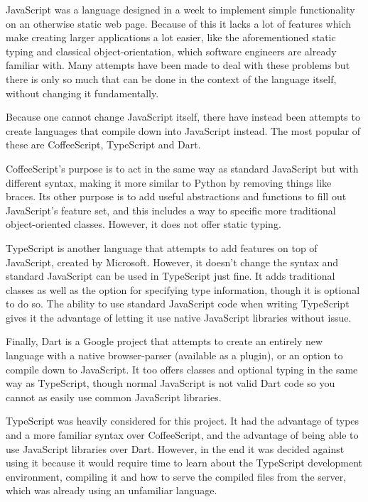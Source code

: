 JavaScript was a language designed in a week to implement simple functionality on an otherwise static web page. Because of this it lacks a lot of features which make creating larger applications a lot easier, like the aforementioned static typing and classical object-orientation, which software engineers are already familiar with. Many attempts have been made to deal with these problems but there is only so much that can be done in the context of the language itself, without changing it fundamentally.

Because one cannot change JavaScript itself, there have instead been attempts to create languages that compile down into JavaScript instead. The most popular of these are CoffeeScript, TypeScript and Dart.

CoffeeScript's purpose is to act in the same way as standard JavaScript but with different syntax, making it more similar to Python by removing things like braces. Its other purpose is to add useful abstractions and functions to fill out JavaScript's feature set, and this includes a way to specific more traditional object-oriented classes. However, it does not offer static typing.

TypeScript is another language that attempts to add features on top of JavaScript, created by Microsoft. However, it doesn't change the syntax and standard JavaScript can be used in TypeScript just fine. It adds traditional classes as well as the option for specifying type information, though it is optional to do so. The ability to use standard JavaScript code when writing TypeScript gives it the advantage of letting it use native JavaScript libraries without issue.

Finally, Dart is a Google project that attempts to create an entirely new language with a native browser-parser (available as a plugin), or an option to compile down to JavaScript. It too offers classes and optional typing in the same way as TypeScript, though normal JavaScript is not valid Dart code so you cannot as easily use common JavaScript libraries.

TypeScript was heavily considered for this project. It had the advantage of types and a more familiar syntax over CoffeeScript, and the advantage of being able to use JavaScript libraries over Dart. However, in the end it was decided against using it because it would require time to learn about the TypeScript development environment, compiling it and how to serve the compiled files from the server, which was already using an unfamiliar language.

